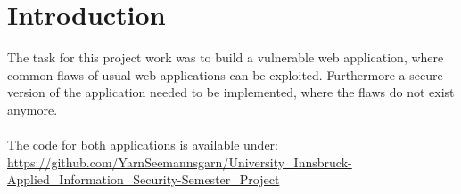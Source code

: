 \section{Introduction}

The task for this project work was to build a vulnerable web application, where common flaws of usual web applications can be exploited. Furthermore a secure version of the application needed to be implemented, where the flaws do not exist anymore.\\
\\
The code for both applications is available under:\\
\href{https://github.com/YarnSeemannsgarn/University_Innsbruck-Applied_Information_Security-Semester_Project}{https://git\allowbreak{}hub.\allowbreak{}com/\allowbreak{}Yarn\allowbreak{}Seemannsgarn/\allowbreak{}Uni\allowbreak{}ver\allowbreak{}si\allowbreak{}ty\_\allowbreak{}Inns\allowbreak{}bruck-\allowbreak{}Applied\_\allowbreak{}In\allowbreak{}for\allowbreak{}ma\allowbreak{}tion\_\allowbreak{}Security-\allowbreak{}Se\allowbreak{}mes\allowbreak{}ter\_\allowbreak{}Pro\allowbreak{}ject}

